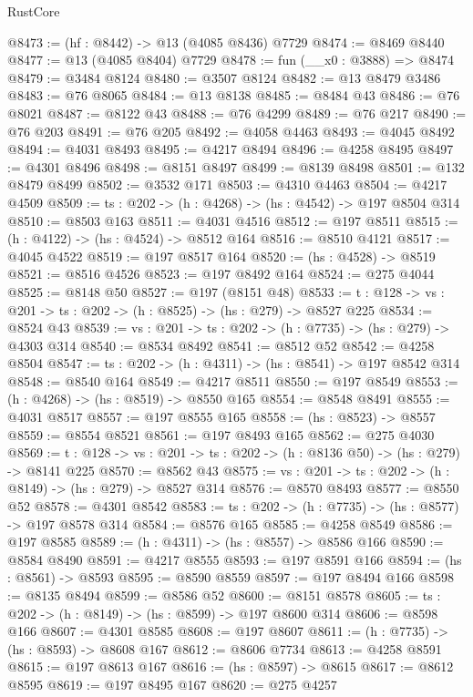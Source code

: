 \begin{lexlean}{RustCore}
\begin{coremodule}
@8473 := (hf : @8442) -> @13 (@4085 @8436) @7729
@8474 := @8469 @8440
@8477 := @13 (@4085 @8404) @7729
@8478 := fun (__x0 : @3888) => @8474
@8479 := @3484 @8124
@8480 := @3507 @8124
@8482 := @13 @8479 @3486
@8483 := @76 @8065
@8484 := @13 @8138
@8485 := @8484 @43
@8486 := @76 @8021
@8487 := @8122 @43
@8488 := @76 @4299
@8489 := @76 @217
@8490 := @76 @203
@8491 := @76 @205
@8492 := @4058 @4463
@8493 := @4045 @8492
@8494 := @4031 @8493
@8495 := @4217 @8494
@8496 := @4258 @8495
@8497 := @4301 @8496
@8498 := @8151 @8497
@8499 := @8139 @8498
@8501 := @132 @8479 @8499
@8502 := @3532 @171
@8503 := @4310 @4463
@8504 := @4217 @4509
@8509 := {ts : @202} -> (h : @4268) -> (hs : @4542) -> @197 @8504 @314
@8510 := @8503 @163
@8511 := @4031 @4516
@8512 := @197 @8511
@8515 := (h : @4122) -> (hs : @4524) -> @8512 @164
@8516 := @8510 @4121
@8517 := @4045 @4522
@8519 := @197 @8517 @164
@8520 := (hs : @4528) -> @8519
@8521 := @8516 @4526
@8523 := @197 @8492 @164
@8524 := @275 @4044
@8525 := @8148 @50
@8527 := @197 (@8151 @48)
@8533 := {t : @128} -> {vs : @201} -> {ts : @202} -> (h : @8525) -> (hs : @279) -> @8527 @225
@8534 := @8524 @43
@8539 := {vs : @201} -> {ts : @202} -> (h : @7735) -> (hs : @279) -> @4303 @314
@8540 := @8534 @8492
@8541 := @8512 @52
@8542 := @4258 @8504
@8547 := {ts : @202} -> (h : @4311) -> (hs : @8541) -> @197 @8542 @314
@8548 := @8540 @164
@8549 := @4217 @8511
@8550 := @197 @8549
@8553 := (h : @4268) -> (hs : @8519) -> @8550 @165
@8554 := @8548 @8491
@8555 := @4031 @8517
@8557 := @197 @8555 @165
@8558 := (hs : @8523) -> @8557
@8559 := @8554 @8521
@8561 := @197 @8493 @165
@8562 := @275 @4030
@8569 := {t : @128} -> {vs : @201} -> {ts : @202} -> (h : @8136 @50) -> (hs : @279) -> @8141 @225
@8570 := @8562 @43
@8575 := {vs : @201} -> {ts : @202} -> (h : @8149) -> (hs : @279) -> @8527 @314
@8576 := @8570 @8493
@8577 := @8550 @52
@8578 := @4301 @8542
@8583 := {ts : @202} -> (h : @7735) -> (hs : @8577) -> @197 @8578 @314
@8584 := @8576 @165
@8585 := @4258 @8549
@8586 := @197 @8585
@8589 := (h : @4311) -> (hs : @8557) -> @8586 @166
@8590 := @8584 @8490
@8591 := @4217 @8555
@8593 := @197 @8591 @166
@8594 := (hs : @8561) -> @8593
@8595 := @8590 @8559
@8597 := @197 @8494 @166
@8598 := @8135 @8494
@8599 := @8586 @52
@8600 := @8151 @8578
@8605 := {ts : @202} -> (h : @8149) -> (hs : @8599) -> @197 @8600 @314
@8606 := @8598 @166
@8607 := @4301 @8585
@8608 := @197 @8607
@8611 := (h : @7735) -> (hs : @8593) -> @8608 @167
@8612 := @8606 @7734
@8613 := @4258 @8591
@8615 := @197 @8613 @167
@8616 := (hs : @8597) -> @8615
@8617 := @8612 @8595
@8619 := @197 @8495 @167
@8620 := @275 @4257

\end{coremodule}
\end{lexlean}
